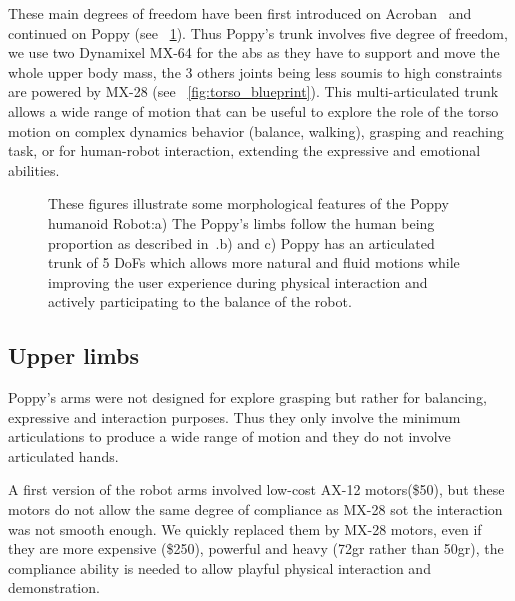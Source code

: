 These main degrees of freedom have been first introduced on Acroban~\parencite{ly2011bio} and continued on Poppy (see \figurename~\ref{fig:poppy_torso}).
Thus Poppy's trunk involves five degree of freedom, we use two Dynamixel MX-64 for the abs as they have to support and move the whole upper body mass, the 3 others joints being less soumis to high constraints are powered by MX-28 (see \figurename~\ref{fig:torso_blueprint}). This multi-articulated trunk allows a wide range of motion that can be useful to explore the role of the torso motion on complex dynamics behavior (balance, walking), grasping and reaching task, or for human-robot interaction, extending the expressive and emotional abilities.

\begin{figure}[p]
\centering


    \hfil
    \caption{These figures illustrate some morphological features of the Poppy humanoid Robot:\newline a) The Poppy's limbs follow the human being proportion as described in~\parencite{dufour2005biomecanique}.\newline b) and c) Poppy has an articulated trunk of 5 DoFs which allows more natural and fluid motions while improving the user experience during physical interaction and actively participating to the balance of the robot.}
    \label{fig:poppy_torso}
\end{figure}



\subsection{Upper limbs} %

Poppy's arms were not designed for explore grasping but rather for balancing, expressive and interaction purposes. Thus they only involve the minimum articulations to produce a wide range of motion and they do not involve articulated hands.

A first version of the robot arms involved low-cost AX-12 motors(\$50), but these motors do not allow the same degree of compliance as MX-28 sot the interaction was not smooth enough. We quickly replaced them by MX-28 motors, even if they are more expensive (\$250), powerful and heavy (72gr rather than 50gr), the compliance ability is needed to allow playful physical interaction and demonstration.

